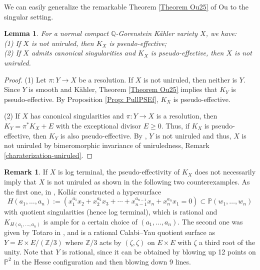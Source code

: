 \documentclass[12pt]{amsart}
\numberwithin{equation}{section}
\newtheorem{lemma}  [theorem]     {Lemma}
\theoremstyle{definition}
\theoremstyle{plain}
\newtheorem*{thm A*}{Theorem A}
\newtheorem*{thm B*}{Theorem B}
\newtheorem*{thm C*}{Theorem C}
\newtheorem*{thm D*}{Theorem D}
\theoremstyle{definition}
\newtheorem{remark}  [theorem]     {Remark}
\renewcommand{\1}{\mathds{1}}
\renewcommand{\>}{\rightarrow}
\begin{document}



We can easily generalize the remarkable Theorem \ref{Theorem Ou25} of Ou to the singular setting. 
\begin{lemma}\label{BDPPCanonical}
For a normal compact $\mathbb{Q}$-Gorenstein K\"ahler variety $X$, we have:\\
\emph{(1)} If $X$ is not uniruled, then $K_X$ is pseudo-effective;\\
\emph{(2)} If $X$ admits canonical singularities and $K_X$ is pseudo-effective, then $X$ is not uniruled. 
\end{lemma}
\begin{proof}
(1) Let $\pi: Y \to X$ be a resolution. If $X$ is not uniruled, then neither is $Y$. Since $Y$ is smooth and K\"ahler, Theorem \ref{Theorem Ou25} implies that $K_Y$ is pseudo-effective. By Proposition \ref{Prop: PullPSEf}, $K_X$ is pseudo-effective. 

(2) If $X$ has canonical singularities and $\pi: Y \to X$ is a resolution, then $K_Y=\pi^*K_X  + E$ with the exceptional divisor $E \ge 0$. Thus, if $K_X$ is pseudo-effective, then $K_Y$ is also pseudo-effective. By \cite[Theorem 1.1]{Ou25}, $Y$ is not uniruled and thus, $X$ is not uniruled by bimeromorphic invariance of uniruledness, Remark \ref{charaterization-uniruled}.
\end{proof}

\begin{remark}
If $X$ is log terminal, the pseudo-effectivity of $K_X$ does not necessarily imply that $X$ is not uniruled as shown in the following two counterexamples. As the first one, in \cite[Section 5]{k-bmy}, Koll\'ar constructed a hypersurface $$H\left(a_1, \ldots, a_n\right):=\left(x_1^{a_1} x_2+x_2^{a_2} x_3+\cdots+x_{n-1}^{a_{n-1}} x_n+x_n^{a_n} x_1=0\right) \subset \mathbb{P}\left(w_1, \ldots, w_n\right)$$ with quotient singularities (hence log terminal), which is rational and $K_{H(a_1,\ldots ,a_n)}$ is ample for a certain choice of $(a_1, \ldots , a_n)$. The second one was given by Totaro in \cite[Example on p. 245]{Totaro10}, and is a rational Calabi--Yau quotient surface as $Y  = E \times E / (\mathbb{Z}/3)$ where $\mathbb{Z}/3$ acts by $(\zeta ,\zeta )$ on $E\times E $ with $\zeta$ a third root of the unity. Note that $Y$ is rational, since it can be obtained by blowing up 12 points on $\mathbb{P}^2$ in the Hesse configuration and then blowing down 9 lines.
\end{remark}
\end{document}

